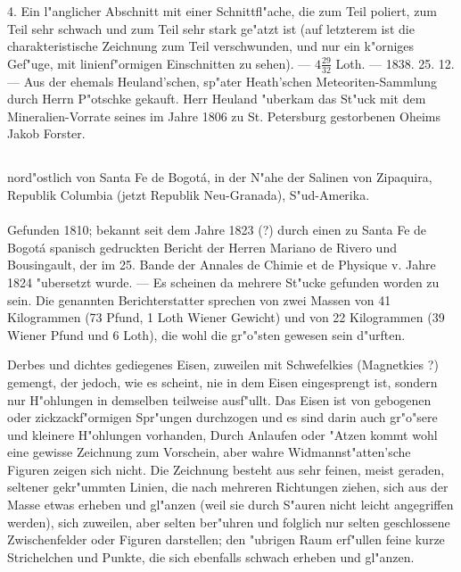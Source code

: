 \documentclass[a4paper, 11pt, oneside, polutonikogreek, german]{article}
\begin{document}
4. Ein l"anglicher Abschnitt mit einer Schnittfl"ache, die zum Teil poliert, zum Teil sehr schwach und zum Teil sehr stark ge"atzt ist (auf letzterem ist die charakteristische Zeichnung zum Teil verschwunden, und nur ein k"orniges Gef"uge, mit linienf"ormigen Einschnitten zu sehen). --- $\mathfrak{4\frac{29}{32}}$ Loth. --- 1838. 25. 12. --- Aus der ehemals Heuland'schen, sp"ater Heath'schen Meteoriten-Sammlung durch Herrn P"otschke gekauft. Herr Heuland "uberkam das St"uck mit dem Mineralien-Vorrate seines im Jahre 1806 zu St. Petersburg gestorbenen Oheims Jakob Forster.
\subsection[\swabfamily {Rasgatà.}]{}
\begin{center}

nord"ostlich von Santa Fe de Bogotá, in der N"ahe der Salinen von Zipaquira, Republik Columbia (jetzt Republik Neu-Granada), S"ud-Amerika.
\end{center}
\paragraph{}
Gefunden 1810; bekannt seit dem Jahre 1823 (?) durch einen zu Santa Fe de Bogotá spanisch gedruckten Bericht der Herren Mariano de Rivero und Bousingault, der im 25. Bande der Annales de Chimie et de Physique v. Jahre 1824 "ubersetzt wurde. --- Es scheinen da mehrere St"ucke gefunden worden zu sein. Die genannten Berichterstatter sprechen von zwei Massen von 41 Kilogrammen (73 Pfund, 1 Loth Wiener Gewicht) und von 22 Kilogrammen (39 Wiener Pfund und 6 Loth), die wohl die gr"o"sten gewesen sein d"urften.

Derbes und dichtes gediegenes Eisen, zuweilen mit Schwefelkies (Magnetkies ?) gemengt, der jedoch, wie es scheint, nie in dem Eisen eingesprengt ist, sondern nur H"ohlungen in demselben teilweise ausf"ullt. Das Eisen ist von gebogenen oder zickzackf"ormigen Spr"ungen durchzogen und es sind darin auch gr"o"sere und kleinere H"ohlungen vorhanden, Durch Anlaufen oder "Atzen kommt wohl eine gewisse Zeichnung zum Vorschein, aber wahre Widmannst"atten'sche Figuren zeigen sich nicht. Die Zeichnung besteht aus sehr feinen, meist geraden, seltener gekr"ummten Linien, die nach mehreren Richtungen ziehen, sich aus der Masse etwas erheben und gl"anzen (weil sie durch S"auren nicht leicht angegriffen werden), sich zuweilen, aber selten ber"uhren und folglich nur selten geschlossene Zwischenfelder oder Figuren darstellen; den "ubrigen Raum erf"ullen feine kurze Strichelchen und Punkte, die sich ebenfalls schwach erheben und gl"anzen.
\end{document}
